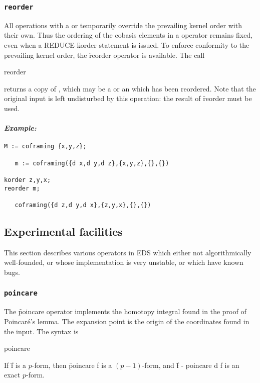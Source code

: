 \subsubsection{\tt reorder}
\label{reorder}

All operations with a  or  temporarily override
the prevailing kernel order with their own. Thus the ordering of the
cobasis elements in a  operator remains fixed, even when a
REDUCE \f{korder} statement is issued. To enforce conformity to the
prevailing kernel order, the \f{reorder} operator is available. The call
\begin{edssyntax}
	reorder 
\end{edssyntax}
returns a copy of , which may be a  or an
 which has been reordered. Note that the original input is left
undisturbed by this operation: the result of \f{reorder} must be used.

\paragraph{\it Example:}
\begin{verbatim}
M := coframing {x,y,z};

   m := coframing({d x,d y,d z},{x,y,z},{},{}) 

korder z,y,x;
reorder m;

   coframing({d z,d y,d x},{z,y,x},{},{}) 
\end{verbatim}




\subsection{Experimental facilities}
\label{Experimental facilities}

This section describes various operators in EDS which either not
algorithmically well-founded, or whose implementation is very unstable, or
which have known bugs.


\subsubsection{\tt poincare}
\label{poincare}

The \f{poincare} operator implements the homotopy integral found in the
proof of Poincar{\'e}'s lemma. The expansion point is the origin of the
coordinates found in the input. The syntax is
\begin{edssyntax}
	poincare 
\end{edssyntax}
If \f{f} is a $p$-form, then \f{poincare f} is a $(p-1)$-form, and
\f{f - poincare d f} is an exact $p$-form.


